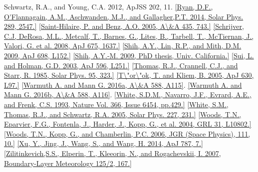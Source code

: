 \documentclass[10pt,preprint]{aastex}  %
\begin{document}
\begin{references}
{	Schwartz, R.A., and Young, C.A. 2012, ApJSS 202, 11.}
\ref{Ryan, D.F., O'Flannagain, A.M., Aschwanden, M.J., and Gallagher,P.T.
 	2014, Solar Phys. 289, 2547.}
\ref{Saint-Hilaire, P. and Benz, A.O. 2005, A\&A 435, 743.}
\ref{Schrijver, C.J, DeRosa, M.L., Metcalf, T., Barnes, G., Lites, B.,
	Tarbell, T., McTiernan, J., Valori, G. et al. 2008, ApJ 675, 1637.}
\ref{Shih, A.Y., Lin, R.P., and Mith, D.M. 2009, ApJ 698, L152.}
\ref{Shih, A.Y.-M. 2009, PhD thesis, Univ. California.}
\ref{Sui, L. and Holman, G.D. 2003, ApJ 596, L251.}
\ref{Thomas, R.J., Crannell, C.J., and Starr, R. 1985, Solar Phys. 95, 323.}
\ref{T\"or\"ok, T. and Kliem, B. 2005, ApJ 630, L97.}
\ref{Warmuth A. and Mann G. 2016a, A\&A 588, A115}. 
\ref{Warmuth A. and Mann G. 2016b, A\&A 588, A116}. 
\ref{White, S.D.M., Navarro, J.F., Evrard, A.E., and Frenk, C.S.
	1993, Nature Vol. 366, Issue 6454, pp.429.}
\ref{White, S.M., Thomas, R.J., and Schwartz, R.A. 2005, 
 	Solar Phys. 227, 231.}
\ref{Woods, T.N., Eparvier, F.G., Fontenla, J., Harder, J., Kopp, G., et al.
	2004, GRL 31, L10802.}
\ref{Woods, T.N., Kopp, G., and Chamberlin, P.C. 2006, JGR (Space Physics), 
	111, 10.}
\ref{Xu, Y., Jing, J., Wang, S., and Wang, H. 2014, ApJ 787, 7.}
\ref{Zilitinkevich,S.S., Elperin, T., Kleeorin, N., and Rogachevskii, I.
	2007, Boundary-Layer Meteorology 125/2, 167.}
\end{references}
\clearpage
\end{document}
